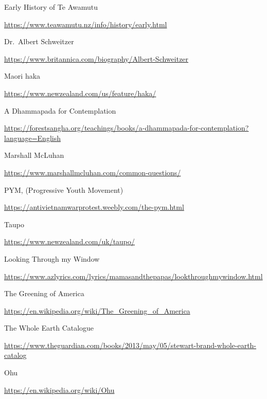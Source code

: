 
\renewcommand*{\prebibhook}{%
  Readers of the print version of \emph{In Any Given Moment} are invited to visit the
  `teachings' section of \href{https://forestsangha.org}{www.forestsangha.org}
  where they can download an electronic version of this book making the links
  below more readily accessible.}

\begin{thebibliography}{9}

 Early History of Te Awamutu

  {\urlsize \url{https://www.teawamutu.nz/info/history/early.html}}

 Dr.~Albert Schweitzer

  {\urlsize \url{https://www.britannica.com/biography/Albert-Schweitzer}}

 Maori haka

  {\urlsize \url{https://www.newzealand.com/us/feature/haka/}}

 A Dhammapada for Contemplation

  {\urlsize \url{https://forestsangha.org/teachings/books/a-dhammapada-for-contemplation?language=English}}

 Marshall McLuhan

  {\urlsize \url{https://www.marshallmcluhan.com/common-questions/}}

 PYM, (Progressive Youth Movement)

  {\urlsize \url{https://antivietnamwarprotest.weebly.com/the-pym.html}}

 Taupo

  {\urlsize \url{https://www.newzealand.com/uk/taupo/}}

 Looking Through my Window

  {\urlsize \url{https://www.azlyrics.com/lyrics/mamasandthepapas/lookthroughmywindow.html}}

 The Greening of America

  {\urlsize \url{https://en.wikipedia.org/wiki/The_Greening_of_America}}
 
 The Whole Earth Catalogue

  {\urlsize \url{https://www.theguardian.com/books/2013/may/05/stewart-brand-whole-earth-catalog}}

 Ohu

  {\urlsize \url{https://en.wikipedia.org/wiki/Ohu}}


\end{thebibliography}

